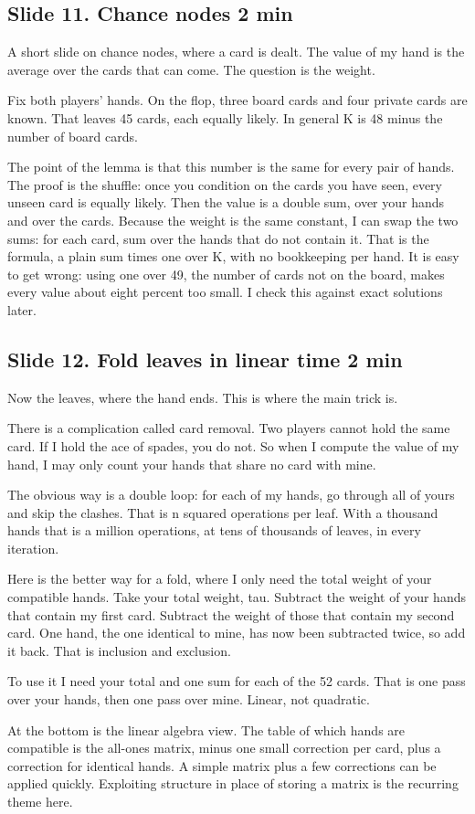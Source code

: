 \documentclass[11pt]{article}
\newcommand{\slidehead}[3]{\subsection*{Slide #1. #2 \hfill {\normalfont\small #3}}}
\begin{document}
\slidehead{11}{Chance nodes}{2 min}
\begin{say}
A short slide on chance nodes, where a card is dealt. The value of my hand is the average over the cards that can
come. The question is the weight.

Fix both players' hands. On the flop, three board cards and four private cards are known. That leaves 45 cards,
each equally likely. In general K is 48 minus the number of board cards.

The point of the lemma is that this number is the same for every pair of hands. The proof is the shuffle: once
you condition on the cards you have seen, every unseen card is equally likely. Then the value is a double sum, over
your hands and over the cards. Because the weight is the same constant, I can swap the two sums: for each card, sum
over the hands that do not contain it. That is the formula, a plain sum times one over K, with no bookkeeping per hand. It is easy to get wrong: using one over 49, the number of cards not
on the board, makes every value about eight percent too small. I check this against exact solutions later.
\end{say}

\slidehead{12}{Fold leaves in linear time}{2 min}
\begin{say}
Now the leaves, where the hand ends. This is where the main trick is.

There is a complication called card removal. Two players cannot hold the same card. If I hold the ace of spades,
you do not. So when I compute the value of my hand, I may only count your hands that share no card with mine.

The obvious way is a double loop: for each of my hands, go through all of yours and skip the clashes. That is n
squared operations per leaf. With a thousand hands that is a million operations, at tens of thousands of leaves, in
every iteration.

Here is the better way for a fold, where I only need the total weight of your compatible hands. Take your total
weight, tau. Subtract the weight of your hands that contain my first card. Subtract the weight of those that contain
my second card. One hand, the one identical to mine, has now been subtracted twice, so add it back. That is
inclusion and exclusion.

To use it I need your total and one sum for each of the 52 cards. That is one pass over your hands, then one pass
over mine. Linear, not quadratic.

At the bottom is the linear algebra view. The table of which hands are compatible is the all-ones matrix, minus one
small correction per card, plus a correction for identical hands. A simple matrix plus a few corrections can be
applied quickly. Exploiting structure in place of storing a matrix is the recurring theme here.
\end{say}
\end{document}
